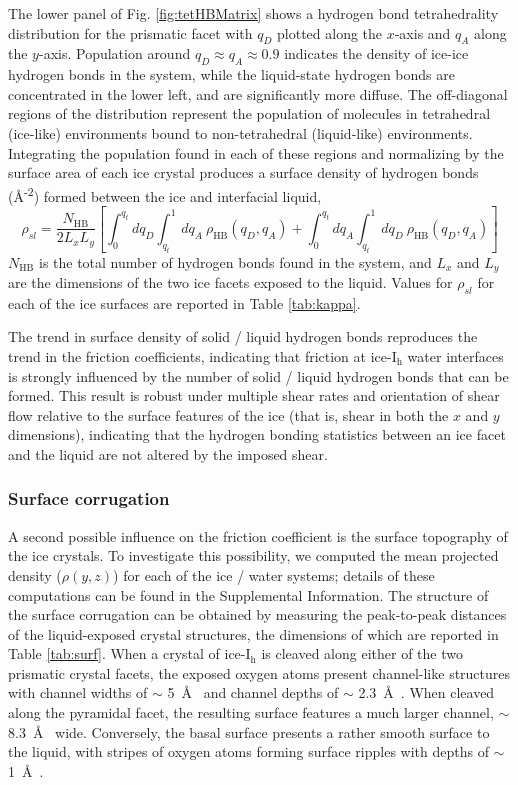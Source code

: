 The lower panel of Fig. \ref{fig:tetHBMatrix} shows a hydrogen bond
tetrahedrality distribution for the prismatic facet with $q_{D}$
plotted along the $x$-axis and $q_{A}$ along the $y$-axis.  Population
around $q_{D} \approx q_{A} \approx 0.9$ indicates the density of
ice-ice hydrogen bonds in the system, while the liquid-state hydrogen
bonds are concentrated in the lower left, and are significantly more
diffuse.  The off-diagonal regions of the distribution represent the
population of molecules in tetrahedral (ice-like) environments bound
to non-tetrahedral (liquid-like) environments. Integrating the
population found in each of these regions and normalizing by the
surface area of each ice crystal produces a surface density of
hydrogen bonds (\AA\textsuperscript{-2}) formed between the ice and
interfacial liquid,
\begin{equation}\label{hbondDensity}
\rho_{sl} = \frac{N_\mathrm{HB}}{2 L_{x}L_{y}} \left[ \int_0^{q_{t}}
  dq_{D} \int_{q_{t}}^1 dq_{A}~\rho_\mathrm{HB}(q_{D},q_{A}) +  \int_0^{q_{t}}
  dq_{A} \int_{q_{t}}^1 dq_{D}~\rho_\mathrm{HB}(q_{D},q_{A}) \right]
\end{equation}
$N_\mathrm{HB}$ is the total number of hydrogen bonds found in the
system, and $L_x$ and $L_y$ are the dimensions of the two ice facets
exposed to the liquid.  Values for $\rho_{sl}$ for each of the ice
surfaces are reported in Table \ref{tab:kappa}.

The trend in surface density of solid / liquid hydrogen bonds
reproduces the trend in the friction coefficients, indicating that
friction at ice-I$_\mathrm{h}$ water interfaces is strongly influenced
by the number of solid / liquid hydrogen bonds that can be formed.
This result is robust under multiple shear rates and orientation of
shear flow relative to the surface features of the ice (that is, shear
in both the $x$ and $y$ dimensions), indicating that the hydrogen
bonding statistics between an ice facet and the liquid are not altered
by the imposed shear.

\subsubsection{Surface corrugation}
A second possible influence on the friction coefficient is the surface
topography of the ice crystals. To investigate this possibility, we
computed the mean projected density ($\rho(y,z)$) for each of the
ice / water systems; details of these computations can be found in the
Supplemental Information. The structure of the surface corrugation can
be obtained by measuring the peak-to-peak distances of the
liquid-exposed crystal structures, the dimensions of which are
reported in Table \ref{tab:surf}. When a crystal of ice-I$_\mathrm{h}$
is cleaved along either of the two prismatic crystal facets, the
exposed oxygen atoms present channel-like structures with channel
widths of $\sim$ 5~\AA~ and channel depths of $\sim$ 2.3~\AA~.  When
cleaved along the pyramidal facet, the resulting surface features a
much larger channel, $\sim$ 8.3~\AA~ wide.  Conversely, the basal
surface presents a rather smooth surface to the liquid, with stripes
of oxygen atoms forming surface ripples with depths of $\sim$ 1~\AA~.

